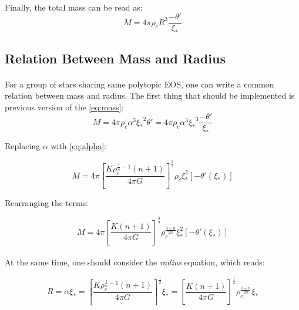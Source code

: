 \documentclass[letterpaper,12pt]{article}
\begin{document}
\paragraph{} Finally, the total mass can be read as:
\begin{equation}
    \label{eq:mass}
\boxed{ M = 4 \pi \rho_c R^3 \frac{-\theta'}{{\xi_*}}}
\end{equation}


\subsection{Relation Between Mass and Radius}

\paragraph{} For a group of stars sharing same polytopic EOS, one can write a common relation between mass and radius. The first thing that should be implemented is previous version of the \eqref{eq:mass}:
\begin{equation*}
    M = 4 \pi \rho_c \alpha^3 {\xi_*}^2 \theta' = 4 \pi \rho_c \alpha^3 {\xi_*}^3 \frac{-\theta'}{{\xi_*}}
\end{equation*}

Replacing $\alpha$ with \eqref{eq:alpha}:

\begin{equation*}
    M = 4 \pi \left[\frac{K \rho_c^{\frac{1}{n}-1}\left(n+1\right)}{4 \pi G}\right]^{\frac{3}{2}} \rho_c \xi_*^2 \left[-\theta'(\xi_*)\right]
\end{equation*}

Rearranging the terms:

\begin{equation}
    \label{eq:mass2}
    M = 4 \pi \left[\frac{K\left(n+1\right)}{4 \pi G}\right]^{\frac{3}{2}} \rho_c^{\frac{3-n}{2n}} \xi_*^2 \left[-\theta'(\xi_*)\right]
\end{equation}

\paragraph{} At the same time, one should consider the \textit{radius} equation, which reads:

\begin{equation}
    \label{eq:radius}
    R = \alpha \xi_* = \left[\frac{K \rho_c^{\frac{1}{n}-1}\left(n+1\right)}{4 \pi G}\right]^{\frac{1}{2}}\xi_* = \left[\frac{K \left(n+1\right)}{4 \pi G}\right]^{\frac{1}{2}} \rho_c^{\frac{1-n}{2n}} \xi_*
\end{equation}
\end{document}

